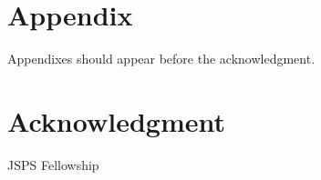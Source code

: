 \documentclass[letterpaper, 10 pt, conference]{ieeeconf}  %
\begin{document}



\section*{Appendix}

Appendixes should appear before the acknowledgment.

\section*{Acknowledgment}

JSPS Fellowship





\end{document}
